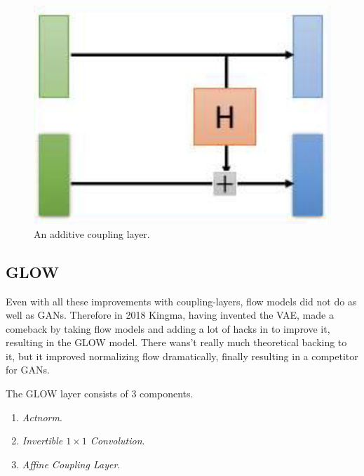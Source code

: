 \documentclass{article}
\begin{document}
    \begin{figure}[H]
      \centering 
      \includegraphics[scale=0.4]{img/nice_coupling.png}
      \caption{An additive coupling layer. } 
      \label{fig:nice_coupling}
    \end{figure}

\subsection{GLOW} 

  Even with all these improvements with coupling-layers, flow models did not do as well as GANs. Therefore in 2018 Kingma, having invented the VAE, made a comeback by taking flow models and adding a lot of hacks in \cite{glow} to improve it, resulting in the GLOW model. There wans't really much theoretical backing to it, but it improved normalizing flow dramatically, finally resulting in a competitor for GANs. 

  \begin{definition}
    The GLOW layer consists of 3 components. 
    \begin{enumerate}
      \item \textit{Actnorm}. 
      \item \textit{Invertible $1 \times 1$ Convolution}. 
      \item \textit{Affine Coupling Layer}. 
    \end{enumerate}
  \end{definition} 
\end{document}

